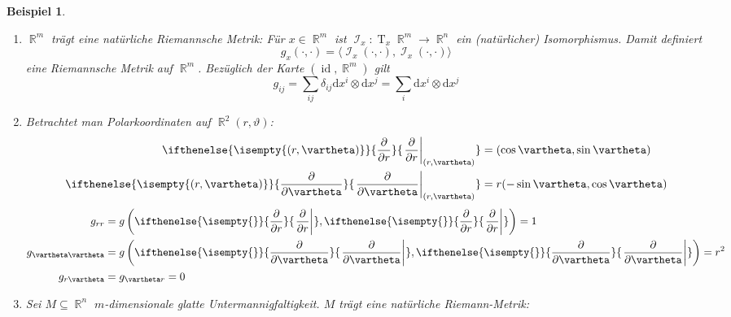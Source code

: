 \documentclass[paper=A4, twoside, chapterprefix=true, bibliography=totoc, headsepline]{scrbook}
\let\temp\phi{}
\let\phi\varphi{}
\let\varphi\temp{}
\let\temp\theta{}
\let\theta\vartheta{}
\let\vartheta\temp{}
\let\temp\epsilon{}
\let\epsilon\varepsilon{}
\let\varepsilon\temp{}
\let\temp\rho{}
\let\rho\varrho{}
\let\varrho\temp{}
\DeclareMathOperator{\R}{\mathbb{R}}
\DeclareMathOperator{\calI}{\mathcal{I}}
\DeclareMathOperator{\Id}{id}       %
\DeclareMathOperator{\T}{T}         %
\newcommand{\dop}{\mathrm{d}}
\newcommand{\pdifffrac}[3][]{\ifthenelse{\isempty{#1}}{\frac{\partial #2}{\partial #3}}{\left. \frac{\partial #2}{\partial #3} \right|_{#1}}}
\theoremstyle{plain}
\theoremstyle{nonumberplain}
\newtheorem{bsp}{Beispiel}
\theoremstyle{empty}
\theoremstyle{break}
\begin{document}
\begin{bsp}
  \begin{enumerate}[label=(\arabic*),leftmargin=*]
  \item $\R^m$ tr\"agt eine nat\"urliche Riemannsche Metrik: F\"ur $x \in \R^m$ ist $\calI_x: \T_x\R^m \to \R^n$ ein (nat\"urlicher) Isomorphismus.
    Damit definiert
    \[ g_x(\cdot,\cdot) = \langle \calI_x(\cdot,\cdot), \calI_x(\cdot,\cdot) \rangle \]
    eine Riemannsche Metrik auf $\R^m$. Bez\"uglich der Karte $(\Id, \R^m)$ gilt
    \[ g_{ij} = \sum_{ij} \delta_{ij} \dop x^{i} \otimes \dop x^j = \sum_i \dop x^{i} \otimes \dop x^j \]
  \item Betrachtet man Polarkoordinaten auf $\R^2(r, \theta)$:
    \begin{align*}
      \pdifffrac[(r,\theta)]{}{r} &= (\cos \theta, \sin \theta)\\
      \pdifffrac[(r,\theta)]{}{\theta} &= r(-\sin \theta, \cos \theta)
    \end{align*}
    \begin{align*}
      g_{rr} &= g\left( \pdifffrac{}{r}, \pdifffrac{}{r} \right) = 1\\
      g_{\theta\theta} &= g\left( \pdifffrac{}{\theta}, \pdifffrac{}{\theta} \right) = r^2\\
      g_{r\theta} &= g_{\theta r} = 0
    \end{align*}
  \item Sei $M \subseteq \R^n$ $m$-dimensionale glatte Untermannigfaltigkeit. $M$ tr\"agt eine nat\"urliche Riemann-Metrik:
    \begin{center}
\end{center}
\end{enumerate}
\end{bsp}
\end{document}
